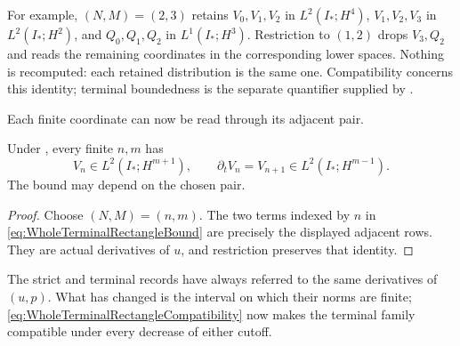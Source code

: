 For example, \((N,M)=(2,3)\) retains \(V_0,V_1,V_2\) in
\(L^2(I_*;H^4)\), \(V_1,V_2,V_3\) in \(L^2(I_*;H^2)\), and
\(Q_0,Q_1,Q_2\) in \(L^1(I_*;H^3)\).  Restriction to \((1,2)\) drops
\(V_3,Q_2\) and reads the remaining coordinates in the corresponding lower
spaces.  Nothing is recomputed: each retained distribution is the same one.
Compatibility concerns this identity; terminal boundedness is the separate
quantifier supplied by .

Each finite coordinate can now be read through its adjacent pair.
\begin{proposition}\label{prop:AdjacentRowRecovery}
Under , every finite \(n,m\)
has
\begin{equation}\label{eq:WholeTerminalAdjacentRows}
  V_n\in L^2(I_*;H^{m+1}),
  \qquad
  \partial_tV_n=V_{n+1}\in L^2(I_*;H^{m-1}).
\end{equation}
The bound may depend on the chosen pair.
\end{proposition}

\begin{proof}
Choose \((N,M)=(n,m)\).  The two terms indexed by \(n\) in
\eqref{eq:WholeTerminalRectangleBound} are precisely the displayed adjacent
rows.  They are actual derivatives of \(u\), and restriction preserves that
identity.
\end{proof}

The strict and terminal records have always referred to the same derivatives of
\((u,p)\).  What has changed is the interval on which their norms are finite;
\eqref{eq:WholeTerminalRectangleCompatibility} now makes the terminal family
compatible under every decrease of either cutoff.
